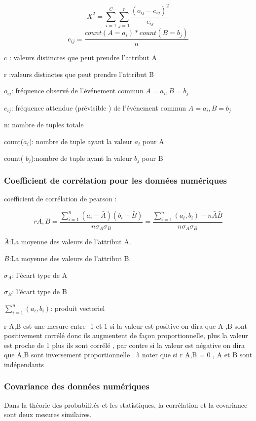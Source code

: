 \documentclass[12pt,a4paper,oneside]{book}
\begin{document}
\begin{equation*}
	X^2 = \sum_{i=1}^{C}\sum_{j=1}^{r}\frac{(o_{ij}- e_{ij})^2}{e_{ij}}
\end{equation*}
\begin{equation*}
	e_{ij}= \frac{count(A=a_{i})* count(B=b_{j})}{n}
\end{equation*}

c : valeurs distinctes que peut prendre l'attribut A

r :valeurs distinctes que peut prendre  l'attribut B

$o_{ij}$: fréquence observé de l'événement commun $A=a_{i},B=b_{j}$

$e_{ij}$: fréquence attendue (prévisible ) de l'événement commun $A=a_{i},B=b_{j}$

n: nombre de tuples totale

count($a_{i}$): nombre de tuple ayant la valeur $a_{i}$ pour A

count( $b_{j}$):nombre de tuple ayant la valeur $b_{j}$ pour B

\subsubsection{Coefficient de corrélation pour les données numériques} 
coefficient de corrélation de pearson :

\begin{equation*}
	r A,B= \frac{\sum_{i=1}^{n} (a_{i}-\bar{A})(b_{i}-\bar{B})}{n\sigma_{A} \sigma_{B} }= \frac{\sum_{i=1}^{n} (a_{i},b_{i})-n\bar{A}\bar{B}}{n\sigma_{A} \sigma_{B} }
\end{equation*}

$\bar{A}$:La moyenne des valeurs de l'attribut A.

$\bar{B}$:La moyenne des valeurs de l'attribut B.

$\sigma_{A}$: l'écart type de A

$\sigma_{B}$: l'écart type de B

$\sum_{i=1}^{n} (a_{i},b_{i})$: produit vectoriel


r A,B est une mesure entre -1 et 1 si la valeur est positive on dira que A ,B sont positivement corrélé  donc ils augmentent de façon proportionnelle, plus la valeur est proche de  1 plus ils sont corrélé , par contre si la valeur est négative on dira que A,B sont inversement proportionnelle .
à noter que si r A,B = 0 , A et B sont indépendants
\subsubsection{Covariance des données numériques}
Dans la théorie des probabilités et les statistiques, la corrélation et la covariance sont deux mesures similaires.
\end{document}
